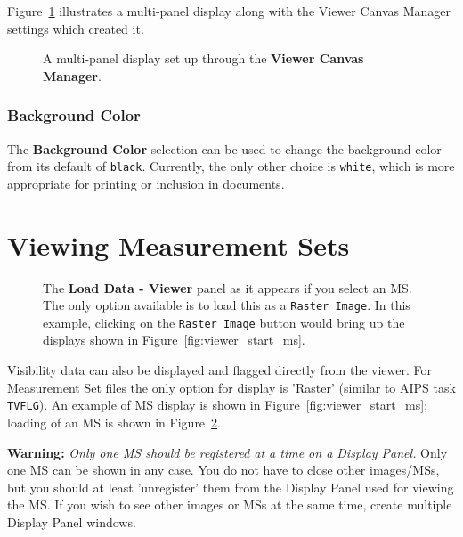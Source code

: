 Figure~\ref{fig:viewer_canvas} illustrates a multi-panel display along
with the Viewer Canvas Manager settings which created it. 

\begin{figure}[h!]
\begin{center}
\caption{\label{fig:viewer_canvas} A multi-panel display
set up through the {\bf Viewer Canvas Manager}.} 
\hrulefill
\end{center}
\end{figure}

\subsubsection{Background Color}
\label{section:display.viewerGUI.canvas.background}

The {\bf Background Color} selection can be used to change the
background color from its default of {\tt black}.  Currently,
the only other choice is {\tt white}, which is more appropriate
for printing or inclusion in documents.

\section{Viewing Measurement Sets}
\label{section:display.ms}

\begin{figure}[h!]
\begin{center}
\caption{\label{fig:viewer_load_ms} The {\bf Load Data - Viewer} panel
as it appears if you select an MS.  The only option available is
to load this as a {\tt Raster Image}.  In this example, clicking
on the {\tt Raster Image} button would bring up the displays shown
in Figure~\ref{fig:viewer_start_ms}.}
\hrulefill
\end{center}
\end{figure}

Visibility data can also be displayed and flagged directly from the
viewer. For Measurement Set files the only option for display is 'Raster'
(similar to AIPS task {\tt TVFLG}).  An example of MS display is
shown in Figure~\ref{fig:viewer_start_ms}; loading of an
MS is shown in Figure~\ref{fig:viewer_load_ms}.  

{\bf Warning:} {\em Only one MS should be registered at a time on a
Display Panel.} 
Only one MS can be shown in any case.  
You do not have to close other images/MSs, but you should at
least 'unregister' them from the Display Panel used for viewing the MS.
If you wish to see other images or MSs at the same time, create multiple
Display Panel windows.

